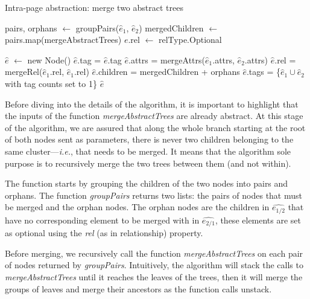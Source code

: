 \begin{algorithm}
\caption{Intra-page abstraction: merge two abstract trees}\label{appstract:alg:mergeAbstractTrees}
\begin{algorithmic}[1]
    \State {}
    \State pairs, orphans $\gets$ groupPairs($\hat{e}_1$, $\hat{e}_2$)
    \State mergedChildren $\gets$ pairs.map(mergeAbstractTrees)
        \State $e$.rel $\gets$ relType.Optional
    \EndFor
    
    \State $\hat{e}$ $\gets$ new Node()
    \State $\hat{e}$.tag = $\hat{e}$.tag
    \State $\hat{e}$.attrs = mergeAttrs($\hat{e}_1$.attrs, $\hat{e}_2$.attrs)
    \State $\hat{e}$.rel = mergeRel($\hat{e}_1$.rel, $\hat{e}_1$.rel)
    \State $\hat{e}$.children = mergedChildren + orphans
    \State $\hat{e}$.tags = \{$\hat{e}_1 \cup \hat{e}_2$ with tag counts set to 1\}
    \State \Return $\hat{e}$
  \EndFunction
\end{algorithmic}
\end{algorithm}

Before diving into the details of the algorithm, it is important to highlight that the inputs of the function \emph{mergeAbstractTrees} are already abstract.
At this stage of the algorithm, we are assured that along the whole branch starting at the root of both nodes sent as parameters, there is never two children belonging to the same cluster---\emph{i.e.}, that needs to be merged.
It means that the algorithm sole purpose is to recursively merge the two trees between them (and not within).

The function starts by grouping the children of the two nodes into pairs and orphans.
The function \emph{groupPairs} returns two lists: the pairs of nodes that must be merged and the orphan nodes. 
The orphan nodes are the children in $\hat{e_{1/2}}$ that have no corresponding element to be merged with in $\hat{e_{2/1}}$, these elements are set as optional using the \emph{rel} (as in relationship) property.

Before merging, we recursively call the function \emph{mergeAbstractTrees} on each pair of nodes returned by \emph{groupPairs}.
Intuitively, the algorithm will stack the calls to \emph{mergeAbstractTrees} until it reaches the leaves of
the trees, then it will merge the groups of leaves and merge their ancestors as the function calls unstack.

